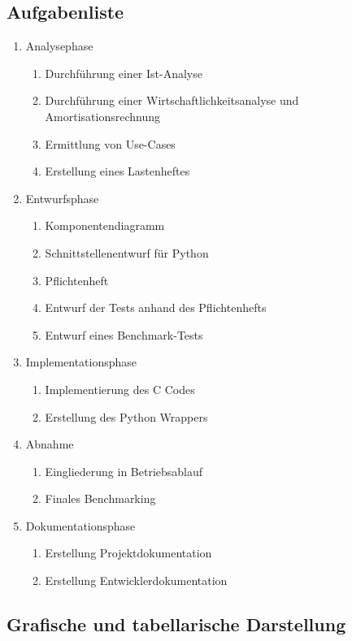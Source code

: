 \documentclass[fontsize=12pt,paper=a4,draft=off,titlepage=off]{scrartcl}
\begin{document}
\subsection{Aufgabenliste}
\begin{enumerate}
\item Analysephase
    \begin{enumerate}
    \item Durchführung einer Ist-Analyse
    \item Durchführung einer Wirtschaftlichkeitsanalyse und Amortisationsrechnung
    \item Ermittlung von Use-Cases
    \item Erstellung eines Lastenheftes
    \end{enumerate}
\item{Entwurfsphase}
    \begin{enumerate}
    \item Komponentendiagramm
    \item Schnittstellenentwurf für Python
    \item Pflichtenheft
    \item Entwurf der Tests anhand des Pflichtenhefts
    \item Entwurf eines Benchmark-Tests
    \end{enumerate}
\item{Implementationsphase}
    \begin{enumerate}
    \item Implementierung des C Codes
    \item Erstellung des Python Wrappers
    \end{enumerate}
\item{Abnahme}
    \begin{enumerate}
    \item Eingliederung in Betriebsablauf
    \item Finales Benchmarking
    \end{enumerate}
\item{Dokumentationsphase}
    \begin{enumerate}
    \item Erstellung Projektdokumentation
    \item Erstellung Entwicklerdokumentation
    \end{enumerate}
\end{enumerate}

\subsection{Grafische und tabellarische Darstellung}
\end{document}

